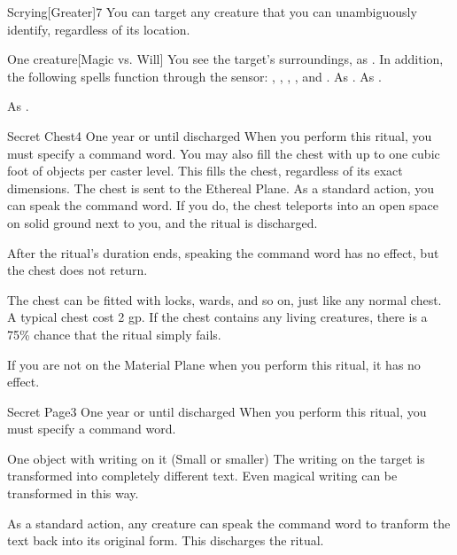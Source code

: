 \begin{spellsection}{Scrying}[Greater]{7}
\spelldur \durext \dismissable
\spellspecial You can target any creature that you can unambiguously identify, regardless of its location.
\begin{spelltarget}{One creature}[Magic vs. Will]
    \spellsuccess You see the target's surroundings, as . In addition, the following spells function through the sensor: , , , , and .
    \spellfailure As .
    \spellspecial As .
\end{spelltarget}
\spellnotes As .
\end{spellsection}

\begin{spellsection}{Secret Chest}{4}
\spelldur One year or until discharged
\spellspecial When you perform this ritual, you must specify a command word. You may also fill the chest with up to one cubic foot of objects per caster level. This fills the chest, regardless of its exact dimensions.
\spellline
\spelleffect The chest is sent to the Ethereal Plane. As a standard action, you can speak the command word. If you do, the chest teleports into an open space on solid ground next to you, and the ritual is discharged.

After the ritual's duration ends, speaking the command word has no effect, but the chest does not return.

\spellnotes The chest can be fitted with locks, wards, and so on, just like any normal chest. A typical chest cost 2 gp. If the chest contains any living creatures, there is a 75\% chance that the ritual simply fails.

If you are not on the Material Plane when you perform this ritual, it has no effect.
\end{spellsection}

\begin{spellsection}{Secret Page}{3}
\spelldur One year or until discharged
\spellspecial When you perform this ritual, you must specify a command word.
\spellline
\begin{spelltarget}{One object with writing on it (Small or smaller)}
    \spelleffect The writing on the target is transformed into completely different text. Even magical writing can be transformed in this way.

    As a standard action, any creature can speak the command word to tranform the text back into its original form. This discharges the ritual.
\end{spelltarget}
\end{spellsection}

